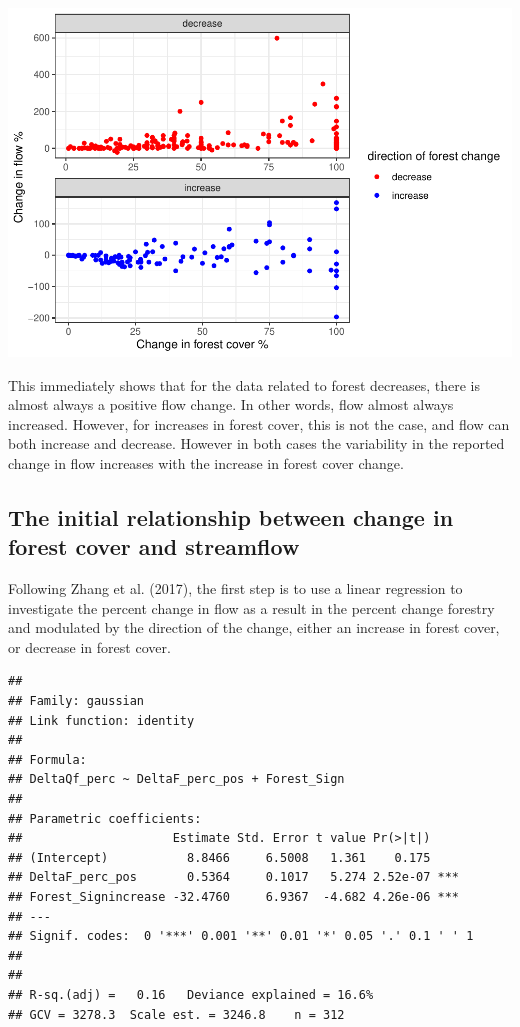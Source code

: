 \documentclass[]{elsarticle} %
\begin{document}
\includegraphics{Forest_and_Water_files/figure-latex/unnamed-chunk-9-1.pdf}

This immediately shows that for the data related to forest decreases,
there is almost always a positive flow change. In other words, flow
almost always increased. However, for increases in forest cover, this is
not the case, and flow can both increase and decrease. However in both
cases the variability in the reported change in flow increases with the
increase in forest cover change.

\hypertarget{the-initial-relationship-between-change-in-forest-cover-and-streamflow}{%
\subsection{The initial relationship between change in forest cover and
streamflow}\label{the-initial-relationship-between-change-in-forest-cover-and-streamflow}}

Following Zhang et al. (2017), the first step is to use a linear
regression to investigate the percent change in flow as a result in the
percent change forestry and modulated by the direction of the change,
either an increase in forest cover, or decrease in forest cover.

\begin{verbatim}
## 
## Family: gaussian 
## Link function: identity 
## 
## Formula:
## DeltaQf_perc ~ DeltaF_perc_pos + Forest_Sign
## 
## Parametric coefficients:
##                     Estimate Std. Error t value Pr(>|t|)    
## (Intercept)           8.8466     6.5008   1.361    0.175    
## DeltaF_perc_pos       0.5364     0.1017   5.274 2.52e-07 ***
## Forest_Signincrease -32.4760     6.9367  -4.682 4.26e-06 ***
## ---
## Signif. codes:  0 '***' 0.001 '**' 0.01 '*' 0.05 '.' 0.1 ' ' 1
## 
## 
## R-sq.(adj) =   0.16   Deviance explained = 16.6%
## GCV = 3278.3  Scale est. = 3246.8    n = 312
\end{verbatim}
\end{document}
